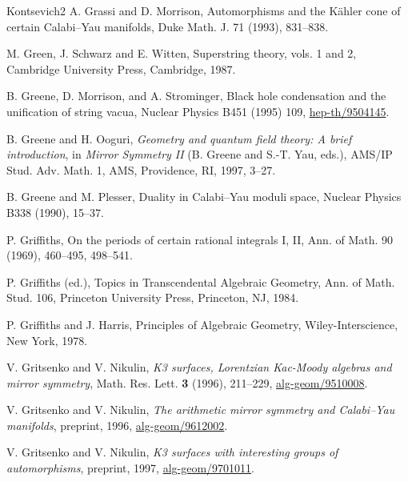 \begin{thebibliography}{Kontsevich2}
\hypertarget{bib:GM}{}
A. Grassi and D. Morrison, Automorphisms and the Kähler cone of certain Calabi--Yau manifolds, Duke Math. J. 71 (1993), 831--838.

\hypertarget{bib:GSW}{}
M. Green, J. Schwarz and E. Witten, Superstring theory, vols. 1 and 2,
Cambridge University Press, Cambridge, 1987.

\hypertarget{bib:GMS}{}
B. Greene, D. Morrison, and A. Strominger, Black hole condensation and the unification of string vacua, Nuclear Physics B451 (1995) 109, \href{https://arxiv.org/abs/hep-th/9504145}{hep-th/9504145}.

\hypertarget{bib:GO}{} B. Greene and H. Ooguri, \emph{Geometry and quantum field theory: A brief introduction}, in \emph{Mirror Symmetry II} (B. Greene and S.-T. Yau, eds.), AMS/IP Stud. Adv. Math. 1, AMS, Providence, RI, 1997, 3--27.

\hypertarget{bib:GPl}{}
B. Greene and M. Plesser, Duality in Calabi--Yau moduli space,
Nuclear Physics B338 (1990), 15--37.

\hypertarget{bib:Griffiths1}{}
P. Griffiths, On the periods of certain rational integrals I, II,
Ann. of Math. 90 (1969), 460--495, 498--541.


\hypertarget{bib:Griffiths2}{}
P. Griffiths (ed.), Topics in Transcendental Algebraic Geometry,
Ann. of Math. Stud. 106, Princeton University Press, Princeton, NJ, 1984.

\hypertarget{bib:GH}{}
P. Griffiths and J. Harris, Principles of Algebraic Geometry, Wiley-Interscience, New York, 1978.

\hypertarget{bib:GN1}{} V. Gritsenko and V. Nikulin, \emph{K3 surfaces, Lorentzian Kac-Moody algebras and mirror symmetry}, Math. Res. Lett. \textbf{3} (1996), 211--229, \href{https://arxiv.org/abs/alg-geom/9510008}{alg-geom/9510008}.

\hypertarget{bib:GN2}{} V. Gritsenko and V. Nikulin, \emph{The arithmetic mirror symmetry and Calabi--Yau manifolds}, preprint, 1996, \href{https://arxiv.org/abs/alg-geom/9612002}{alg-geom/9612002}.

\hypertarget{bib:GN3}{} V. Gritsenko and V. Nikulin, \emph{K3 surfaces with interesting groups of automorphisms}, preprint, 1997, \href{https://arxiv.org/abs/alg-geom/9701011}{alg-geom/9701011}.


\end{thebibliography}
